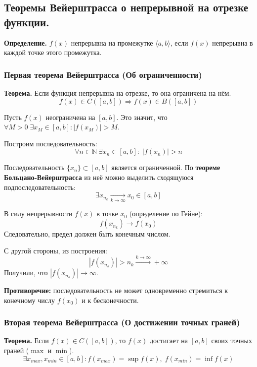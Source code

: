 \subsection{Теоремы Вейерштрасса о непрерывной на отрезке функции.}

\textbf{Определение.} $f(x)$ непрерывна на промежутке $\langle a, b \rangle$, если $f(x)$ непрерывна в каждой точке этого промежутка.

\subsubsection*{Первая теорема Вейерштрасса (Об ограниченности)}
\textbf{Теорема.} Если функция непрерывна на отрезке, то она ограничена на нём.
\[ f(x) \in C([a,b]) \Rightarrow f(x) \in B([a,b]) \]

\begin{tcolorbox}[title=Доказательство (от противного)]
	Пусть $f(x)$ неограничена на $[a, b]$.
	Это значит, что $\forall M > 0 \; \exists x_M \in [a,b]: |f(x_M)| > M$.
	
	Построим последовательность:
	\[ \forall n \in \mathbb{N} \; \exists x_n \in [a, b]:\; |f(x_n)| > n \]
	
	Последовательность $\{x_n\} \subset [a, b]$ является ограниченной. 
	По \textbf{теореме Больцано-Вейерштрасса} из неё можно выделить сходящуюся подпоследовательность:
	\[ \exists x_{n_k} \xrightarrow[k\to \infty]{} x_0 \in [a, b] \]
	
	В силу непрерывности $f(x)$ в точке $x_0$ (определение по Гейне):
	\[ f(x_{n_k}) \to f(x_0) \]
	Следовательно, предел должен быть конечным числом.
	
	С другой стороны, из построения:
	\[ |f(x_{n_k})| > n_k \xrightarrow{k\to\infty} +\infty \]
	Получили, что $|f(x_{n_k})| \to \infty$.
	
	\textbf{Противоречие:} последовательность не может одновременно стремиться к конечному числу $f(x_0)$ и к бесконечности.
\end{tcolorbox}

\subsubsection*{Вторая теорема Вейерштрасса (О достижении точных граней)}
\textbf{Теорема.} Если $f(x) \in C([a, b])$, то $f(x)$ достигает на $[a, b]$ своих точных граней ($\max$ и $\min$).
\[ \exists x_{max}, x_{min} \in [a,b]: f(x_{max}) = \sup f(x), \; f(x_{min}) = \inf f(x) \]

